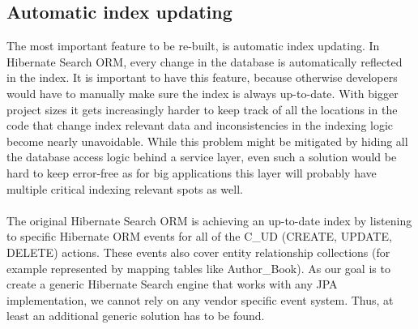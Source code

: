 \pagebreak

%
%

\subsection{Automatic index updating} \label{automatic_indexing_problematic_intro}
The most important feature to be re-built, is automatic index updating. In Hibernate Search ORM, every change in the database is automatically reflected in the index. It is important to have this feature, because otherwise developers would have to manually make sure the index is always up-to-date. With bigger project sizes it gets increasingly harder to keep track of all the locations in the code that change index relevant data and inconsistencies in the indexing logic become nearly unavoidable. While this problem might be mitigated by hiding all the database access logic behind a service layer, even such a solution would be hard to keep error-free as for big applications this layer will probably have multiple critical indexing relevant spots as well.
\\\\
The original Hibernate Search ORM is achieving an up-to-date index by listening to specific Hibernate ORM events for all of the C\_UD (CREATE, UPDATE, DELETE) actions. These events also cover entity relationship collections (for example represented by mapping tables like Author\_Book). As our goal is to create a generic Hibernate Search engine that works with any JPA implementation, we cannot rely on any vendor specific event system. Thus, at least an additional generic solution has to be found.

